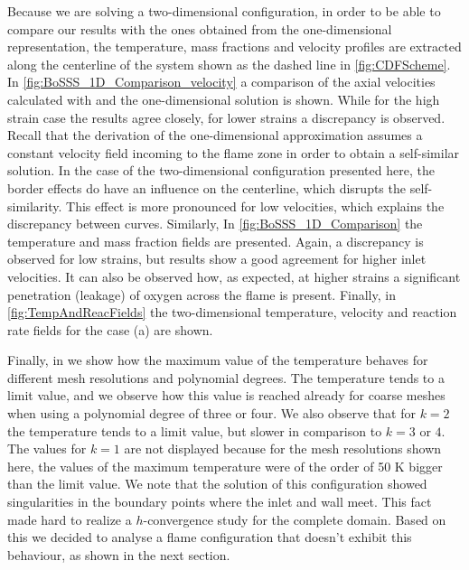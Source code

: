 {Because we are solving a two-dimensional configuration, in order to be able to compare our results with the ones obtained from the one-dimensional representation, the temperature, mass fractions and velocity profiles are extracted along the centerline of the system shown as the dashed line in \cref{fig:CDFScheme}. In \cref{fig:BoSSS_1D_Comparison_velocity} a comparison of the axial velocities calculated with \BoSSS and the one-dimensional solution is shown. While for the high strain case the results agree closely, for lower strains a discrepancy is observed. Recall that the derivation of the one-dimensional approximation assumes a constant velocity field incoming to the flame zone in order to obtain a self-similar solution. In the case of the two-dimensional configuration presented here, the border effects do have an influence on the centerline, which disrupts the self-similarity. This effect is more pronounced for low velocities, which explains the discrepancy between curves. Similarly, In \cref{fig:BoSSS_1D_Comparison} the temperature and mass fraction fields are presented. Again, a discrepancy is observed for low strains, but results show a good agreement for higher inlet velocities. It can also be observed how, as expected, \cite{fernandez-tarrazoSimpleOnestepChemistry2006} at higher strains a significant penetration (leakage) of oxygen across the flame is present. Finally, in \cref{fig:TempAndReacFields} the two-dimensional temperature, velocity and reaction rate fields for the case (a) are shown. 

Finally, in  we show how the maximum value of the temperature behaves for different mesh resolutions and polynomial degrees. The temperature tends to a limit value, and we observe how this value is reached already for coarse meshes when using a polynomial degree of three or four. We also observe that for $k=2$ the temperature tends to a limit value, but slower in comparison to $k =3$ or $4$. The values for $k=1$ are not displayed because for the mesh resolutions shown here, the values of the maximum temperature were of the order of 50 \si{K} bigger than the limit value. We note that the solution of this configuration showed singularities in the boundary points where the inlet and wall meet. This fact made hard to realize a $h$-convergence study for the complete domain. Based on this we decided to analyse a flame configuration that doesn't exhibit this behaviour, as shown in the next section.

}
